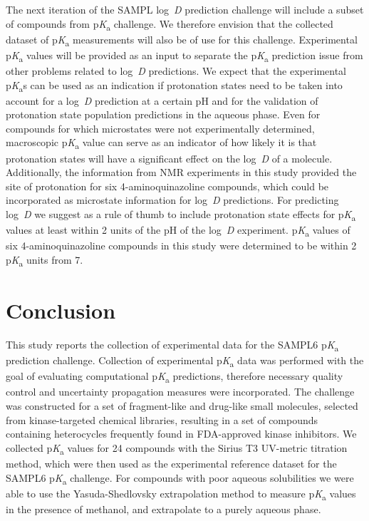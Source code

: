 \documentclass[9pt,lineno]{elife}
\newcommand{\pKa}{p\textit{K}\textsubscript{a}}
\newcommand{\logD}{log~\textit{D}}
\begin{document}
The next iteration of the SAMPL \logD{} prediction challenge will include a subset of compounds from \pKa{} challenge. 
We therefore envision that the collected dataset of \pKa{} measurements will also be of use for this challenge. 
Experimental \pKa{} values will be provided as an input to separate the \pKa{} prediction issue from other problems related to \logD{} predictions.
We expect that the experimental \pKa{}s can be used as an indication if protonation states need to be taken into account for a \logD{} prediction at a certain pH and for the validation of protonation state population predictions in the aqueous phase. 
Even for compounds for which microstates were not experimentally determined, macroscopic \pKa{} value can serve as an indicator of how likely it is that protonation states will have a significant effect on the \logD{} of a molecule. Additionally, the information from NMR experiments in this study provided the site of protonation for six 4-aminoquinazoline compounds, which could be incorporated as microstate information for \logD{} predictions. 
For predicting \logD{} we suggest as a rule of thumb to include protonation state effects for \pKa{} values at least within 2 units of the pH of the \logD{} experiment. \pKa{} values of six 4-aminoquinazoline compounds in this study were determined to be within 2 \pKa{} units from 7.


\section{Conclusion}
This study reports the collection of experimental data for the SAMPL6 \pKa{} prediction challenge. 
Collection of experimental \pKa{} data was performed with the goal of evaluating computational \pKa{} predictions, therefore necessary quality control and uncertainty propagation measures were incorporated. 
The challenge was constructed for a set of fragment-like and drug-like small molecules, selected from kinase-targeted chemical libraries, resulting in a set of compounds containing heterocycles frequently found in FDA-approved kinase inhibitors. 
We collected \pKa{} values for 24 compounds with the Sirius T3 UV-metric titration method, which were then used as the experimental reference dataset for the SAMPL6 \pKa{} challenge.
For compounds with poor aqueous solubilities we were able to use the Yasuda-Shedlovsky extrapolation method to measure \pKa{} values in the presence of methanol, and extrapolate to a purely aqueous phase.
\end{document}
